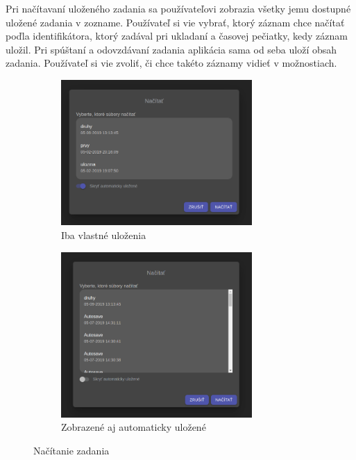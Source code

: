 Pri načítavaní uloženého zadania sa používateľovi zobrazia všetky jemu dostupné uložené zadania v
zozname. Používateľ si vie vybrať, ktorý záznam chce načítať poďla identifikátora, ktorý zadával pri
ukladaní a časovej pečiatky, kedy záznam uložil. Pri spúštaní a odovzdávaní zadania aplikácia sama
od seba uloží obsah zadania. Používateľ si vie zvoliť, či chce takéto záznamy vidieť v možnostiach.
\begin{figure}[H]
\centering
\begin{subfigure}{.5\textwidth}
  \centering
  \includegraphics[width=0.8\textwidth]{images/nacitaj_zadanie}
  \caption[Iba vlastné uloženia]{Iba vlastné uloženia}
  \label{obr:nacitaj_zadanie}
\end{subfigure}%
\begin{subfigure}{.5\textwidth}
  \centering
  \includegraphics[width=0.8\textwidth]{images/nacitaj_automaticky_ulozene}
  \caption[Zobrazené aj automaticky uložené]{Zobrazené aj automaticky uložené}
  \label{obr:platny_nazov}
\end{subfigure}
\caption{Načítanie zadania}
\end{figure}

